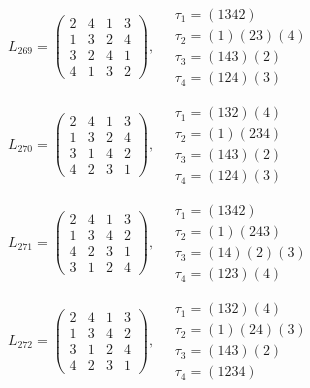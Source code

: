 $L_{269} = \begin{pmatrix} 2 & 4 & 1 & 3 \\ 1 & 3 & 2 & 4 \\ 3 & 2 & 4 & 1 \\ 4 & 1 & 3 & 2 \end{pmatrix}, \quad \begin{matrix} \tau_{1} = (1 3 4 2) \\ \tau_{2} = (1)(2 3)(4) \\ \tau_{3} = (1 4 3)(2) \\ \tau_{4} = (1 2 4)(3) \end{matrix}$

$L_{270} = \begin{pmatrix} 2 & 4 & 1 & 3 \\ 1 & 3 & 2 & 4 \\ 3 & 1 & 4 & 2 \\ 4 & 2 & 3 & 1 \end{pmatrix}, \quad \begin{matrix} \tau_{1} = (1 3 2)(4) \\ \tau_{2} = (1)(2 3 4) \\ \tau_{3} = (1 4 3)(2) \\ \tau_{4} = (1 2 4)(3) \end{matrix}$

$L_{271} = \begin{pmatrix} 2 & 4 & 1 & 3 \\ 1 & 3 & 4 & 2 \\ 4 & 2 & 3 & 1 \\ 3 & 1 & 2 & 4 \end{pmatrix}, \quad \begin{matrix} \tau_{1} = (1 3 4 2) \\ \tau_{2} = (1)(2 4 3) \\ \tau_{3} = (1 4)(2)(3) \\ \tau_{4} = (1 2 3)(4) \end{matrix}$

$L_{272} = \begin{pmatrix} 2 & 4 & 1 & 3 \\ 1 & 3 & 4 & 2 \\ 3 & 1 & 2 & 4 \\ 4 & 2 & 3 & 1 \end{pmatrix}, \quad \begin{matrix} \tau_{1} = (1 3 2)(4) \\ \tau_{2} = (1)(2 4)(3) \\ \tau_{3} = (1 4 3)(2) \\ \tau_{4} = (1 2 3 4) \end{matrix}$

